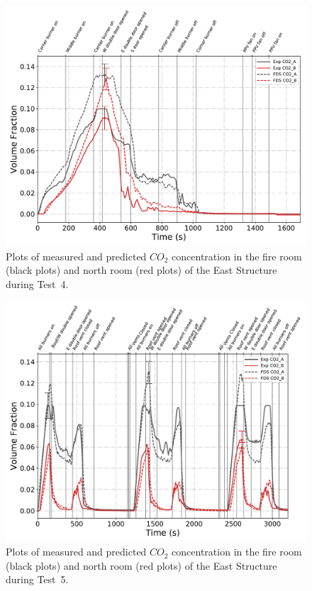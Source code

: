 \begin{figure}[!h]
	\centering
	\includegraphics[width=\columnwidth]{Figures/Plots/Validation/Gas_Concentration/Test_4_CO2}
	\caption[Plots of measured and predicted $CO_2$ concentration during Test~4.]{Plots of measured and predicted $CO_2$ concentration in the fire room (black plots) and north room (red plots) of the East Structure during Test~4.}
	\label{fig:Test4_CO2}
\end{figure}

\begin{figure}[!h]
	\centering
	\includegraphics[width=\columnwidth]{Figures/Plots/Validation/Gas_Concentration/Test_5_CO2}
	\caption[Plots of measured and predicted $CO_2$ concentration during Test~5.]{Plots of measured and predicted $CO_2$ concentration in the fire room (black plots) and north room (red plots) of the East Structure during Test~5.}
	\label{fig:Test5_CO2}
\end{figure}

